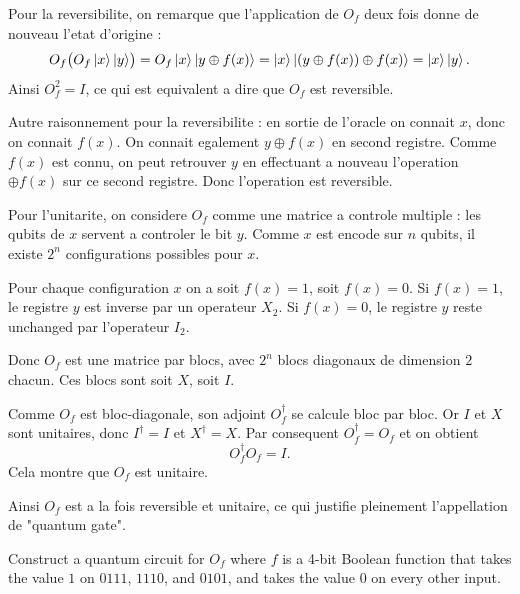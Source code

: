 \documentclass{ceri/sty/rapport}
\newcounter{exercice}[section]
\begin{document}
\begin{solution}
Pour la reversibilite, on remarque que l'application de $O_f$ deux fois donne de nouveau l'etat d'origine :
\[
O_f\bigl(O_f\ket{x}\ket{y}\bigr)
= O_f\ket{x}\ket{y\oplus f(x)}
= \ket{x}\ket{(y\oplus f(x))\oplus f(x)}
= \ket{x}\ket{y}.
\]
Ainsi $O_f^2 = I$, ce qui est equivalent a dire que $O_f$ est reversible.

Autre raisonnement pour la reversibilite : en sortie de l'oracle on connait $x$, donc on connait $f(x)$. On connait egalement $y\oplus f(x)$ en second registre. Comme $f(x)$ est connu, on peut retrouver $y$ en effectuant a nouveau l'operation $\oplus f(x)$ sur ce second registre. Donc l'operation est reversible.

Pour l'unitarite, on considere $O_f$ comme une matrice a controle multiple : les qubits de $x$ servent a controler le bit $y$. Comme $x$ est encode sur $n$ qubits, il existe $2^n$ configurations possibles pour $x$.

Pour chaque configuration $x$ on a soit $f(x)=1$, soit $f(x)=0$. Si $f(x)=1$, le registre $y$ est inverse par un operateur $X_2$. Si $f(x)=0$, le registre $y$ reste unchanged par l'operateur $I_2$.

Donc $O_f$ est une matrice par blocs, avec $2^n$ blocs diagonaux de dimension $2$ chacun. Ces blocs sont soit $X$, soit $I$.

Comme $O_f$ est bloc-diagonale, son adjoint $O_f^\dagger$ se calcule bloc par bloc. Or $I$ et $X$ sont unitaires, donc $I^\dagger = I$ et $X^\dagger = X$. Par consequent $O_f^\dagger = O_f$ et on obtient
\[
O_f^\dagger O_f = I.
\]
Cela montre que $O_f$ est unitaire.

Ainsi $O_f$ est a la fois reversible et unitaire, ce qui justifie pleinement l'appellation de "quantum gate".
\end{solution}

\begin{exercice}
Construct a quantum circuit for $O_f$ where $f$ is a 4-bit Boolean function that takes the value $1$ on $0111$, $1110$, and $0101$, and takes the value $0$ on every other input.
\end{exercice}
\end{document}
